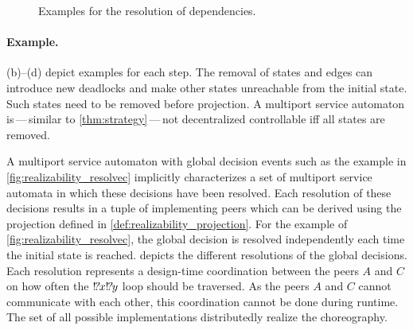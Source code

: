 \begin{figure}
\centering
{}\hfill
{}
\caption{Examples for the resolution of dependencies.}
\label{fig:realizability_resolve}
\end{figure}


\paragraph{Example.}

(b)--(d) depict examples for each step. The removal of states and edges can introduce new deadlocks and make other states unreachable from the initial state. Such states need to be removed before projection. A multiport service automaton is\,---\,similar to \autoref{thm:strategy}\,---\,not decentralized controllable iff all states are removed.

\medskip

A multiport service automaton with global decision events such as the example in \autoref{fig:realizability_resolvec} implicitly characterizes a set of multiport service automata in which these decisions have been resolved. Each resolution of these decisions results in a tuple of implementing peers which can be derived using the projection defined in \autoref{def:realizability_projection}. For the example of \autoref{fig:realizability_resolvec}, the global decision is resolved independently each time the initial state is reached.  depicts the different resolutions of the global decisions. Each resolution represents a design-time coordination between the peers ${A}$ and ${C}$ on how often the ${!\!\textsl{?} x}{!\!\textsl{?} y}$ loop should be traversed. As the peers ${A}$ and ${C}$ cannot communicate with each other, this coordination cannot be done during runtime. The set of all possible implementations distributedly realize the choreography.

